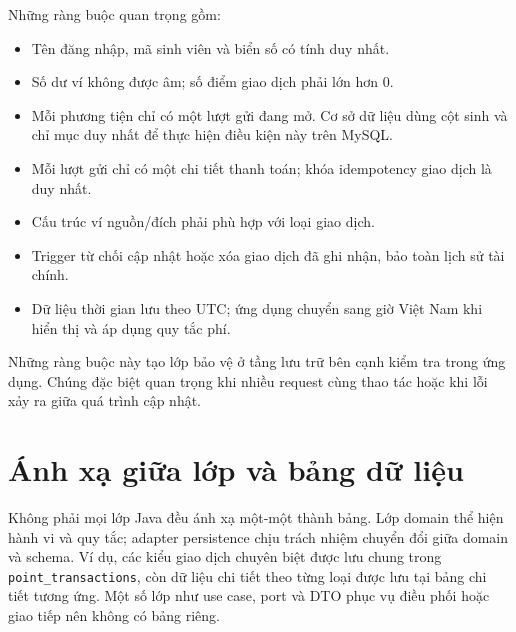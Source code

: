 Những ràng buộc quan trọng gồm:
\begin{itemize}
    \item Tên đăng nhập, mã sinh viên và biển số có tính duy nhất.
    \item Số dư ví không được âm; số điểm giao dịch phải lớn hơn 0.
    \item Mỗi phương tiện chỉ có một lượt gửi đang mở. Cơ sở dữ liệu dùng cột sinh và chỉ mục duy nhất để thực hiện điều kiện này trên MySQL.
    \item Mỗi lượt gửi chỉ có một chi tiết thanh toán; khóa idempotency giao dịch là duy nhất.
    \item Cấu trúc ví nguồn/đích phải phù hợp với loại giao dịch.
    \item Trigger từ chối cập nhật hoặc xóa giao dịch đã ghi nhận, bảo toàn lịch sử tài chính.
    \item Dữ liệu thời gian lưu theo UTC; ứng dụng chuyển sang giờ Việt Nam khi hiển thị và áp dụng quy tắc phí.
\end{itemize}

Những ràng buộc này tạo lớp bảo vệ ở tầng lưu trữ bên cạnh kiểm tra trong ứng dụng. Chúng đặc biệt quan trọng khi nhiều request cùng thao tác hoặc khi lỗi xảy ra giữa quá trình cập nhật.

\section{Ánh xạ giữa lớp và bảng dữ liệu}

Không phải mọi lớp Java đều ánh xạ một-một thành bảng. Lớp domain thể hiện hành vi và quy tắc; adapter persistence chịu trách nhiệm chuyển đổi giữa domain và schema. Ví dụ, các kiểu giao dịch chuyên biệt được lưu chung trong \texttt{point\_transactions}, còn dữ liệu chi tiết theo từng loại được lưu tại bảng chi tiết tương ứng. Một số lớp như use case, port và DTO phục vụ điều phối hoặc giao tiếp nên không có bảng riêng.

